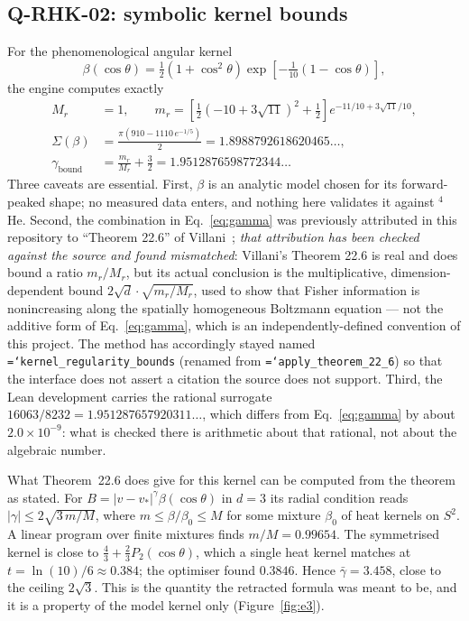 \documentclass[11pt,a4paper]{article}
\newcommand{\code}[1]{\texttt{\hyphenchar\font=`\-\relax #1}}
\begin{document}
\subsection{Q-RHK-02: symbolic kernel bounds}

For the phenomenological angular kernel
\begin{equation}
  \beta(\cos\theta) = \tfrac12\left(1+\cos^{2}\theta\right)
  \exp\!\left[-\tfrac1{10}\left(1-\cos\theta\right)\right],
\end{equation}
the engine computes exactly
\begin{align}
  M_r &= 1, \qquad
  m_r = \left[\tfrac12\left(-10+3\sqrt{11}\right)^{2}+\tfrac12\right]
        e^{-11/10+3\sqrt{11}/10}, \\
  \Sigma(\beta) &= \frac{\pi\left(910 - 1110\,e^{-1/5}\right)}{2}
  = 1.8988792618620465\ldots, \\
  \gamma_{\text{bound}} &= \frac{m_r}{M_r} + \frac32
  = 1.9512876598772344\ldots
  \label{eq:gamma}
\end{align}
Three caveats are essential. First, $\beta$ is an analytic model chosen for its
forward-peaked shape; no measured data enters, and nothing here validates it
against $^4$He. Second, the combination in Eq.~\eqref{eq:gamma} was previously
attributed in this repository to ``Theorem 22.6'' of Villani~\cite{villani2025};
\emph{that attribution has been checked against the source and found
mismatched}: Villani's Theorem 22.6 is real and does bound a ratio $m_r/M_r$,
but its actual conclusion is the multiplicative, dimension-dependent bound
$2\sqrt{d}\cdot\sqrt{m_r/M_r}$, used to show that Fisher information is
nonincreasing along the spatially homogeneous Boltzmann equation --- not the
additive form of Eq.~\eqref{eq:gamma}, which is an independently-defined
convention of this project. The method has accordingly stayed named
\code{kernel\_regularity\_bounds} (renamed from \code{apply\_theorem\_22\_6})
so that the interface does not assert a citation the source does not support.
Third, the
Lean development carries the rational surrogate $16063/8232 =
1.951287657920311\ldots$, which differs from Eq.~\eqref{eq:gamma} by about
$2.0\times10^{-9}$: what is checked there is arithmetic about that rational, not
about the algebraic number.

What Theorem~22.6 does give for this kernel can be computed from the theorem as
stated. For $B=|v-v_*|^\gamma\beta(\cos\theta)$ in $d=3$ its radial condition reads
$|\gamma|\le2\sqrt{3\,m/M}$, where $m\le\beta/\beta_0\le M$ for some mixture $\beta_0$ of heat
kernels on $S^2$. A linear program over finite mixtures finds $m/M=0.99654$. The symmetrised
kernel is close to $\tfrac43+\tfrac23P_2(\cos\theta)$, which a single heat kernel matches at
$t=\ln(10)/6\approx0.384$; the optimiser found $0.3846$. Hence $\bar\gamma=3.458$, close to the
ceiling $2\sqrt3$. This is the quantity the retracted formula was meant to be, and it is a property
of the model kernel only (Figure~\ref{fig:e3}).
\end{document}
